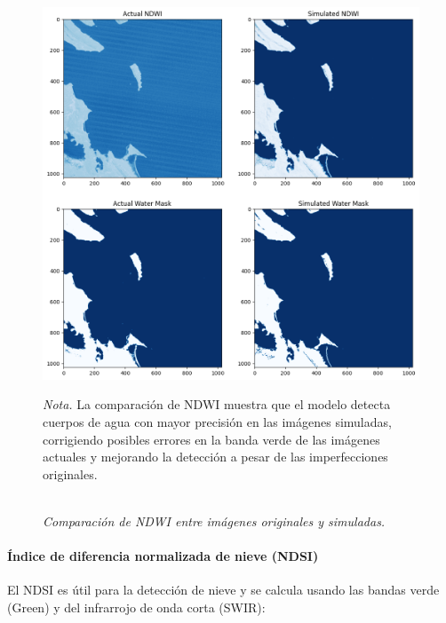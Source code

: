                     \begin{figure}[H] 
                        \caption{\doublespacing \\ \textit{Comparación de NDWI entre imágenes originales y simuladas.}} 
                        \centering
                        \includegraphics[width=1\linewidth]{2_CAPITULO5/IMG/ndwi.png}
                        \begin{justify}
                            \textit{Nota.} La comparación de NDWI muestra que el modelo detecta cuerpos de agua con mayor precisión en las imágenes simuladas, corrigiendo posibles errores en la banda verde de las imágenes actuales y mejorando la detección a pesar de las imperfecciones originales.
                        \end{justify}                    
                        \label{ndwi}
                    \end{figure}

                \paragraph{Índice de diferencia normalizada de nieve (NDSI)}
                    El NDSI es útil para la detección de nieve y se calcula usando las bandas verde (Green) y del infrarrojo de onda corta (SWIR):

